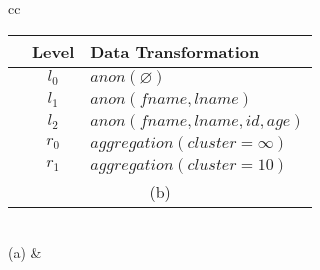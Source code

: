\begin{table*}[ht!]
{\begin{tabular}[t]{cc}
      \begin{tabular}[t]{c|c|l}
        \textbf{\tp{i}} & \textbf{Level} & \textbf{Data Transformation}                      \\\hline
        \tp{0}          & $l_0$          & $anon(\varnothing)$                               \\
        \tp{1}          & $l_1$          & $anon(fname, lname)$                              \\
        \tp{2}          & $l_2$          & $anon(fname, lname, id, age)$                     \\
        \tp{3}          & $r_0$          & $aggregation(cluster=\infty)                    $ \\
        \tp{4}          & $r_1$          & $aggregation(cluster=10)                       $  \\
        \multicolumn{3}{c}{\footnotesize (b)}
      \end{tabular} \\
      \footnotesize (a) &                                                                                          \\
    \end{tabular}
  }
\end{table*}

